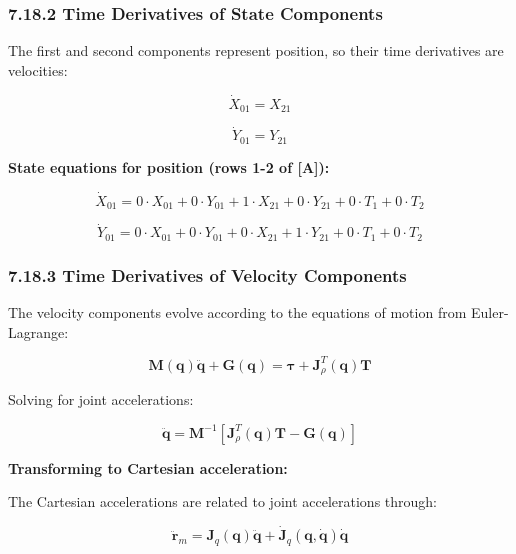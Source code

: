 \subsubsection{7.18.2 Time Derivatives of State Components}

The first and second components represent position, so their time derivatives are velocities:

\begin{equation}
\dot{X}_{01} = X_{21}
\end{equation}

\begin{equation}
\dot{Y}_{01} = Y_{21}
\end{equation}

\textbf{State equations for position (rows 1-2 of [A]):}

\begin{equation}
\dot{X}_{01} = 0 \cdot X_{01} + 0 \cdot Y_{01} + 1 \cdot X_{21} + 0 \cdot Y_{21} + 0 \cdot T_1 + 0 \cdot T_2
\end{equation}

\begin{equation}
\dot{Y}_{01} = 0 \cdot X_{01} + 0 \cdot Y_{01} + 0 \cdot X_{21} + 1 \cdot Y_{21} + 0 \cdot T_1 + 0 \cdot T_2
\end{equation}

\subsubsection{7.18.3 Time Derivatives of Velocity Components}

The velocity components evolve according to the equations of motion from Euler-Lagrange:

\begin{equation}
\mathbf{M}(\mathbf{q}) \ddot{\mathbf{q}} + \mathbf{G}(\mathbf{q}) = \boldsymbol{\tau} + \mathbf{J}_{\rho}^T(\mathbf{q}) \mathbf{T}
\end{equation}

Solving for joint accelerations:

\begin{equation}
\ddot{\mathbf{q}} = \mathbf{M}^{-1} \left[ \mathbf{J}_{\rho}^T(\mathbf{q}) \mathbf{T} - \mathbf{G}(\mathbf{q}) \right]
\end{equation}

\textbf{Transforming to Cartesian acceleration:}

The Cartesian accelerations are related to joint accelerations through:

\begin{equation}
\ddot{\mathbf{r}}_m = \mathbf{J}_q(\mathbf{q}) \ddot{\mathbf{q}} + \dot{\mathbf{J}}_q(\mathbf{q}, \dot{\mathbf{q}}) \dot{\mathbf{q}}
\end{equation}

